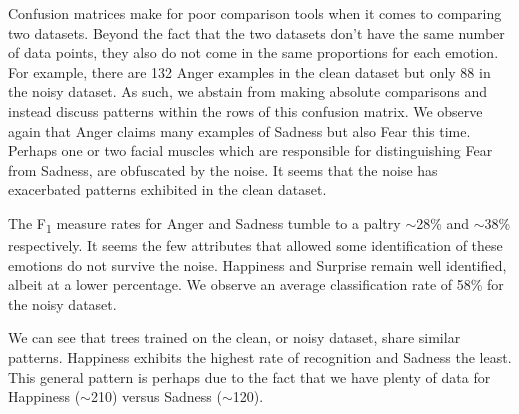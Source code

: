  


Confusion matrices make for poor comparison tools when it comes to comparing two datasets.
Beyond the fact that the two datasets don't have the same number of data points,
they also do not come in the same proportions for each emotion. For example, there are 132 Anger examples in the clean dataset but only
88 in the noisy dataset. As such, we abstain from making absolute comparisons and instead discuss patterns within the rows
of this confusion matrix. We observe again that Anger claims many examples of Sadness but also Fear this time. Perhaps one or two facial
muscles which are responsible for distinguishing Fear from Sadness, are obfuscated by the noise.
It seems that the noise has exacerbated patterns exhibited in the clean dataset.



The F\textsubscript{1} measure rates for Anger and Sadness tumble to a paltry $\sim$28\% and $\sim$38\% respectively.
It seems the few attributes that allowed some identification of these emotions do not survive the noise.
Happiness and Surprise remain well identified, albeit at a lower percentage.
We observe an average classification rate of 58\% for the noisy dataset.


We can see that trees trained on the clean, or noisy dataset, share similar patterns.
Happiness exhibits the highest rate of recognition and Sadness the least.
This general pattern is perhaps due to the fact that we have plenty of data for Happiness ($\sim$210) versus Sadness ($\sim$120).




